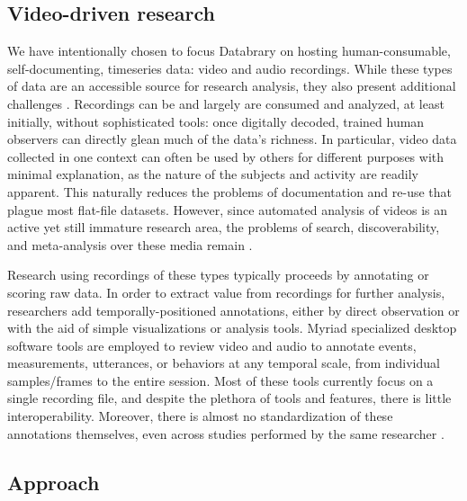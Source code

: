 \documentclass{sig-alternate}
\begin{document}
\subsection{Video-driven research}

We have intentionally chosen to focus Databrary on hosting human-consumable, self-documenting, timeseries data: video and audio recordings.
While these types of data are an accessible source for research analysis, they also present additional challenges \cite{Lanagan_Smeaton_2012}.
Recordings can be and largely are consumed and analyzed, at least initially, without sophisticated tools: once digitally decoded, trained human observers can directly glean much of the data's richness.
In particular, video data collected in one context can often be used by others for different purposes with minimal explanation, as the nature of the subjects and activity are readily apparent.
This naturally reduces the problems of documentation and re-use that plague most flat-file datasets. %
However, since automated analysis of videos is an active yet still immature research area, the problems of search, discoverability, and meta-analysis over these media remain \cite{Albertson_2013}.

Research using recordings of these types typically proceeds by annotating or scoring raw data.
In order to extract value from recordings for further analysis, researchers add temporally-positioned annotations, either by direct observation or with the aid of simple visualizations or analysis tools.
Myriad specialized desktop software tools are employed to review video and audio to annotate events, measurements, utterances, or behaviors at any temporal scale, from individual samples/frames to the entire session.
Most of these tools currently focus on a single recording file, and despite the plethora of tools and features, there is little interoperability.
Moreover, there is almost no standardization of these annotations themselves, even across studies performed by the same researcher \cite{?}.

\subsection{Approach}
\end{document}
